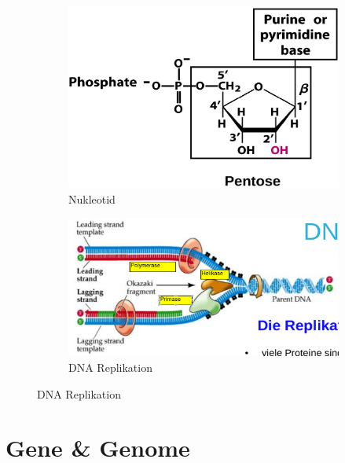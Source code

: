 \documentclass[a4paper,twocolumn,usegeometry,english,fontsize=6,DIV=16]{scrartcl}
\begin{document}
\begin{figure}
	\centering
	\begin{subfigure}{.4\linewidth}
		\centering
		\includegraphics[width=\linewidth]{img/nukleotid.png}
		\caption{Nukleotid}
	\end{subfigure}%
	\begin{subfigure}{.6\linewidth}
		\centering
		\includegraphics[width=\linewidth]{img/dna_replikation.png}
		\caption{DNA Replikation}
	\end{subfigure}%
\end{figure}

\section{Gene \& Genome}
\end{document}
